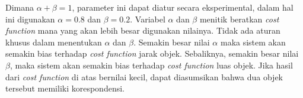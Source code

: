     Dimana $\alpha + \beta = 1$, parameter ini dapat diatur secara eksperimental, dalam hal ini digunakan $\alpha = 0.8$ dan $\beta = 0.2$. Variabel $\alpha$ dan $\beta$ menitik beratkan \textit{cost function} mana yang akan lebih besar digunakan nilainya. Tidak ada aturan khusus dalam menentukan $\alpha$ dan $\beta$. Semakin besar nilai $\alpha$ maka sistem akan semakin bias terhadap \textit{cost function} jarak objek. Sebaliknya, semakin besar nilai $\beta$, maka sistem akan semakin bias terhadap \textit{cost function} luas objek. Jika hasil dari \textit{cost function} di atas bernilai kecil, dapat diasumsikan bahwa dua objek tersebut memiliki korespondensi.
    

